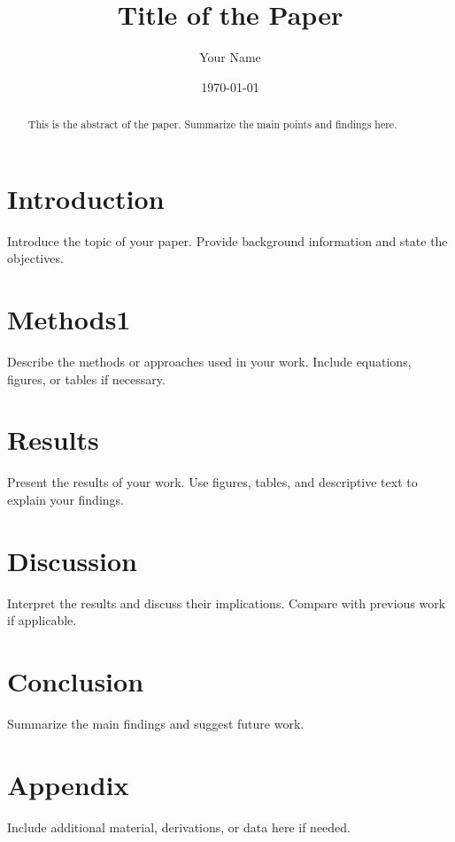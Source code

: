 \documentclass[a4paper,12pt]{article}
\title{Title of the Paper}
\author{Your Name}
\date{\today}
\begin{document}
\maketitle

\begin{abstract}
This is the abstract of the paper. Summarize the main points and findings here.
\end{abstract}

\section{Introduction}
Introduce the topic of your paper. Provide background information and state the objectives.

\section{Methods1}



Describe the methods or approaches used in your work. Include equations, figures, or tables if necessary.

\section{Results}
Present the results of your work. Use figures, tables, and descriptive text to explain your findings.

\section{Discussion}
Interpret the results and discuss their implications. Compare with previous work if applicable.

\section{Conclusion}
Summarize the main findings and suggest future work.

\appendix
\section{Appendix}
Include additional material, derivations, or data here if needed.



\end{document}
